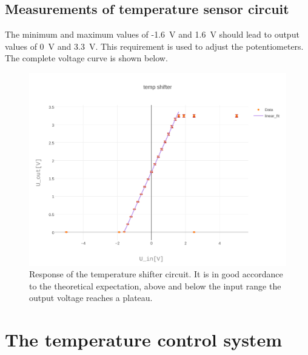 \documentclass[12pt]{scrartcl}
\begin{document}
      \subsection{Measurements of temperature sensor circuit}
        The minimum and maximum values of -1.6~V and 1.6~V should lead to
        output values of 0~V and 3.3~V. This requirement is used to adjust
        the potentiometers. The complete voltage curve is shown below.
        \begin{figure}[H]
          \centering
          \includegraphics[width = 0.55
          \textwidth]{./plots/plot_image(3)}
          \caption{Response of the temperature shifter circuit. It is in good
          accordance to the theoretical expectation, above and below the
          input range the output voltage reaches a plateau.}
          \label{fig9}
        \end{figure}
    \section{The temperature control system}
\end{document}
